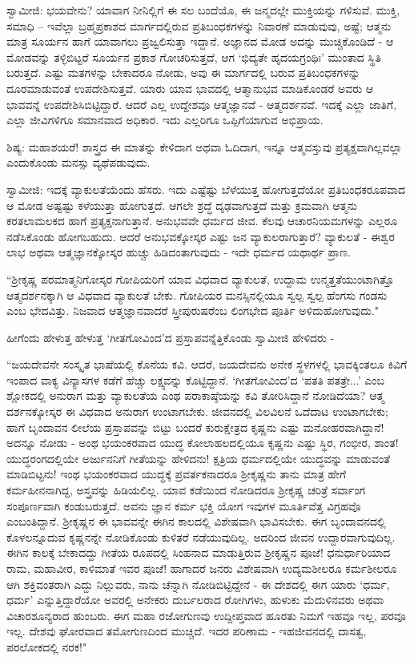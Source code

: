ಸ್ವಾಮೀಜಿ: ಭಯವೇನು? ಯಾವಾಗ ನೀನಿಲ್ಲಿಗೆ ಈ ಸಲ ಬಂದೆಯೊ, ಈ ಜನ್ಮದಲ್ಲೇ ಮುಕ್ತಿಯನ್ನು ಗಳಿಸುವೆ. ಮುಕ್ತಿ, ಸಮಾಧಿ – ಇವೆಲ್ಲಾ ಬ್ರಹ್ಮಪ್ರಕಾಶದ ಮಾರ್ಗದಲ್ಲಿರುವ ಪ್ರತಿಬಂಧಕಗಳನ್ನು ನಿವಾರಣೆ ಮಾಡುವುವು, ಅಷ್ಟೆ; ಆತ್ಮನು ಮಾತ್ರ ಸೂರ್ಯನ ಹಾಗೆ ಯಾವಾಗಲು ಪ್ರಜ್ವಲಿಸುತ್ತಾ ಇದ್ದಾನೆ. ಅಜ್ಞಾನದ ಮೋಡ ಅದನ್ನು ಮುಚ್ಚಿಕೊಂಡಿದೆ - ಆ ಮೋಡವನ್ನು ತಳ್ಳಿಬಿಟ್ಟರೆ ಸೂರ್ಯನ ಪ್ರಕಾಶ ಗೋಚರಿಸುತ್ತದೆ, ಆಗ ‘ಭಿದ್ಯತೇ ಹೃದಯಗ್ರಂಥಿಃ’ ಮುಂತಾದ ಸ್ಥಿತಿ ಬರುತ್ತದೆ. ಎಷ್ಟು ಮತಗಳನ್ನು ಬೇಕಾದರೂ ನೋಡು, ಅವು ಈ ಮಾರ್ಗದಲ್ಲಿ ಬರುವ ಪ್ರತಿಬಂಧಕಗಳನ್ನು ದೂರಮಾಡುವಂತೆ ಉಪದೇಶಿಸುತ್ತವೆ. ಯಾರು ಯಾವ ಭಾವದಲ್ಲಿ ಆತ್ಮಾನುಭವ ಮಾಡಿಕೊಂಡರೆ ಅವರು ಆ ಭಾವವನ್ನೆ ಉಪದೇಶಿಸಿಬಿಟ್ಟಿದ್ದಾರೆ. ಆದರೆ ಎಲ್ಲ ಉದ್ದೇಶವೂ ಆತ್ಮಜ್ಞಾನವೆ - ಆತ್ಮದರ್ಶನವೆ. ಇದಕ್ಕೆ ಎಲ್ಲಾ ಜಾತಿಗೆ, ಎಲ್ಲಾ ಜೀವಿಗಳಿಗೂ ಸಮಾನವಾದ ಅಧಿಕಾರ. ಇದು ಎಲ್ಲರಿಗೂ ಒಪ್ಪಿಗೆಯಾಗುವ ಅಭಿಪ್ರಾಯ.

ಶಿಷ್ಯ: ಮಹಾಶಯರೆ! ಶಾಸ್ತ್ರದ ಈ ಮಾತನ್ನು ಕೇಳಿದಾಗ ಅಥವಾ ಓದಿದಾಗ, ಇನ್ನೂ ಆತ್ಮವಸ್ತುವು ಪ್ರತ್ಯಕ್ಷವಾಗಿಲ್ಲವಲ್ಲಾ ಎಂದುಕೊಂಡು ಮನಸ್ಸು ವ್ಯಥೆಪಡುವುದು.

ಸ್ವಾಮೀಜಿ: ಇದಕ್ಕೆ ವ್ಯಾಕುಲತೆಯೆಂದು ಹೆಸರು. ಇದು ಎಷ್ಟೆಷ್ಟು ಬೆಳೆಯುತ್ತ ಹೋಗುತ್ತದೆಯೋ ಪ್ರತಿಬಂಧಕರೂಪವಾದ ಆ ಮೋಡ ಅಷ್ಟಷ್ಟು ಕಳೆಯುತ್ತಾ ಹೋಗುತ್ತದೆ. ಆಗಲೇ ಶ್ರದ್ಧೆ ದೃಢವಾಗುತ್ತದೆ ಮತ್ತು ಕ್ರಮವಾಗಿ ಆತ್ಮನು ಕರತಲಾಮಲಕದ ಹಾಗೆ ಪ್ರತ್ಯಕ್ಷನಾಗುತ್ತಾನೆ. ಅನುಭವವೇ ಧರ್ಮದ ಜೀವ. ಕೆಲವು ಆಚಾರನಿಯಮಗಳನ್ನು ಎಲ್ಲರೂ ನಡೆಸಿಕೊಂಡು ಹೋಗಬಹುದು. ಆದರೆ ಅನುಭವಕ್ಕೋಸ್ಕರ ಎಷ್ಟು ಜನ ವ್ಯಾಕುಲರಾಗುತ್ತಾರೆ? ವ್ಯಾಕುಲತೆ - ಈಶ್ವರ ಲಾಭ ಅಥವಾ ಆತ್ಮಜ್ಞಾನಕ್ಕೋಸ್ಕರ ಹುಚ್ಚು ಹಿಡಿದಂತಾಗುವುದು - ಇದೇ ಧರ್ಮದ ಯಥಾರ್ಥ ಪ್ರಾಣ.

“ಶ‍್ರೀಕೃಷ್ಣ ಪರಮಾತ್ಮನಿಗೋಸ್ಕರ ಗೋಪಿಯರಿಗೆ ಯಾವ ವಿಧವಾದ ವ್ಯಾಕುಲತೆ, ಉದ್ದಾಮ ಉನ್ಮತ್ತತೆಯುಂಟಾಗಿತ್ತೊ ಆತ್ಮದರ್ಶನಕ್ಕಾಗಿ ಆ ವಿಧವಾದ ವ್ಯಾಕುಲತೆ ಬೇಕು. ಗೋಪಿಯರ ಮನಸ್ಸಿನಲ್ಲಿಯೂ ಸ್ವಲ್ಪ ಸ್ವಲ್ಪ ಹೆಂಗಸು ಗಂಡಸು ಎಂಬ ಭೇದವಿತ್ತು. ನಿಜವಾದ ಆತ್ಮಜ್ಞಾನವಾದರೆ ಸ್ತ್ರೀಪುರುಷರೆಂಬ ಲಿಂಗಭೇದ ಪೂರ್ತಿ ಅಳಿದುಹೋಗುವುದು."

ಹೀಗೆಂದು ಹೇಳುತ್ತ ಹೇಳುತ್ತ ‘ಗೀತಗೋವಿಂದ’ದ ಪ್ರಸ್ತಾಪವನ್ನೆತ್ತಿಕೊಂಡು ಸ್ವಾಮೀಜಿ ಹೇಳಿದರು -

“ಜಯದೇವನೇ ಸಂಸ್ಕೃತ ಭಾಷೆಯಲ್ಲಿ ಕೊನೆಯ ಕವಿ. ಆದರೆ, ಜಯದೇವನು ಅನೇಕ ಸ್ಥಳಗಳಲ್ಲಿ ಭಾವಕ್ಕಿಂತಲೂ ಕಿವಿಗೆ ಇಂಪಾದ ವಾಕ್ಯ ವಿನ್ಯಾಸಗಳ ಕಡೆಗೆ ಹೆಚ್ಚು ಲಕ್ಷ್ಯವನ್ನು ಕೊಟ್ಟಿದ್ದಾನೆ. ‘ಗೀತಗೋವಿಂದ’ದ ‘ಪತತಿ ಪತತ್ರೇ...’ ಎಂಬ ಶ್ಲೋಕದಲ್ಲಿ ಅನುರಾಗ ಮತ್ತು ವ್ಯಾಕುಲತೆಯ ಎಂಥ ಪರಾಕಾಷ್ಠೆಯನ್ನು ಕವಿ ತೋರಿಸಿದ್ದಾನೆ ನೋಡಿದೆಯಾ? ಆತ್ಮ ದರ್ಶನಕ್ಕೋಸ್ಕರ ಈ ವಿಧವಾದ ಅನುರಾಗ ಉಂಟಾಗಬೇಕು. ಜೀವನದಲ್ಲಿ ವಿಲವಿಲನೆ ಒದೆದಾಟ ಉಂಟಾಗಬೇಕು; ಹಾಗೆ ಬೃಂದಾವನ ಲೀಲೆಯ ಪ್ರಸ್ತಾಪವನ್ನು ಬಿಟ್ಟು ಬಂದರೆ ಕುರುಕ್ಷೇತ್ರದ ಕೃಷ್ಣನು ಎಷ್ಟು ಮನೋಹರವಾಗಿದ್ದಾನೆ! ಅದನ್ನೂ ನೋಡು - ಅಂಥ ಭಯಂಕರವಾದ ಯುದ್ಧ ಕೋಲಾಹಲದಲ್ಲಿಯೂ ಕೃಷ್ಣನು ಎಷ್ಟು ಸ್ಥಿರ, ಗಂಭೀರ, ಶಾಂತ! ಯುದ್ಧರಂಗದಲ್ಲಿಯೇ ಅರ್ಜುನನಿಗೆ ಗೀತೆಯನ್ನು ಹೇಳಿದನು! ಕ್ಷತ್ರಿಯ ಧರ್ಮದಲ್ಲಿಯೇ ಯುದ್ಧವನ್ನು ಮಾಡುವಂತೆ ಮಾಡಿಬಿಟ್ಟನು! ಇಂಥ ಭಯಂಕರವಾದ ಯುದ್ಧಕ್ಕೆ ಪ್ರವರ್ತಕನಾದರೂ ಶ‍್ರೀಕೃಷ್ಣನು ತಾನು ಮಾತ್ರ ಹೇಗೆ ಕರ್ಮಹೀನನಾಗಿದ್ದ, ಅಸ್ತ್ರವನ್ನು ಹಿಡಿಯಲಿಲ್ಲ. ಯಾವ ಕಡೆಯಿಂದ ನೋಡಿದರೂ ಶ‍್ರೀಕೃಷ್ಣ ಚರಿತ್ರೆ ಸರ್ವಾಂಗ ಸಂಪೂರ್ಣವಾಗಿ ಕಂಡುಬರುತ್ತದೆ. ಅವನು ಜ್ಞಾನ ಕರ್ಮ ಭಕ್ತಿ ಯೋಗ ಇವುಗಳ ಮೂರ್ತಿವೆತ್ತ ವಿಗ್ರಹವೊ ಎಂಬಂತಿದ್ದಾನೆ. ಶ‍್ರೀಕೃಷ್ಣನ ಈ ಭಾವವನ್ನೇ ಈಗಿನ ಕಾಲದಲ್ಲಿ ವಿಶೇಷವಾಗಿ ಭಾವಿಸಬೇಕು. ಈಗ ಬೃಂದಾವನದಲ್ಲಿ ಕೊಳಲನ್ನೂದುವ ಕೃಷ್ಣನನ್ನೇ ನೋಡಿಕೊಂಡು ಕುಳಿತರೆ ನಡೆಯುವುದಿಲ್ಲ. ಅದರಿಂದ ಜೀವನ ಉದ್ದಾರವಾಗುವುದಿಲ್ಲ. ಈಗಿನ ಕಾಲಕ್ಕೆ ಬೇಕಾದದ್ದು ಗೀತೆಯ ರೂಪದಲ್ಲಿ ಸಿಂಹನಾದ ಮಾಡುತ್ತಿರುವ ಶ‍್ರೀಕೃಷ್ಣನ ಪೂಜೆ! ಧನುರ್ಧಾರಿಯಾದ ರಾಮ, ಮಹಾವೀರ, ಕಾಳಿಮಾತೆ ಇವರ ಪೂಜೆ! ಹಾಗಾದರೆ ಜನರು ವಿಶೇಷವಾಗಿ ಉದ್ಯಮಶೀಲರೂ ಕರ್ಮಶೀಲರೂ ಆಗಿ ಶಕ್ತಿವಂತರಾಗಿ ಎದ್ದು ನಿಲ್ಲುವರು, ನಾನು ಚೆನ್ನಾಗಿ ನೋಡಿಬಿಟ್ಟಿದ್ದೇನೆ - ಈ ದೇಶದಲ್ಲಿ ಈಗ ಯಾರು ‘ಧರ್ಮ, ಧರ್ಮ’ ಎನ್ನುತ್ತಿದ್ದಾರೆಯೋ ಅವರಲ್ಲಿ ಅನೇಕರು ದುರ್ಬಲರಾದ ರೋಗಿಗಳು, ಹುಳುಕು ಮೆದುಳಿನವರು ಅಥವಾ ವಿಚಾರಶೂನ್ಯರಾದ ಹುಂಬರು. ಈಗ ಮಹಾ ರಜೋಗುಣವು ಉದ್ದೀಪ್ತವಾದ ಹೂರತು ನಿಮಗೆ ಇಹವೂ ಇಲ್ಲ, ಪರವೂ ಇಲ್ಲ. ದೇಶವು ಘೋರವಾದ ತಮೋಗುಣದಿಂದ ಮುಚ್ಚಿದೆ. ಇದರ ಪರಿಣಾಮ - ಇಹಜೀವನದಲ್ಲಿ ದಾಸತ್ವ, ಪರಲೋಕದಲ್ಲಿ ನರಕ!"


